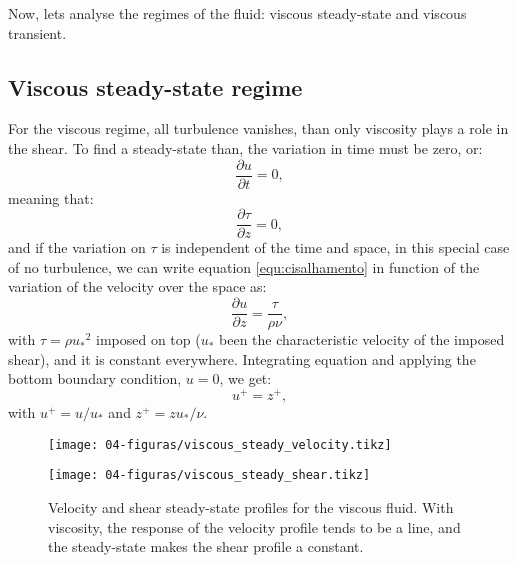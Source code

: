     Now, lets analyse the regimes of the fluid: viscous steady-state and viscous transient.

\subsection{Viscous steady-state regime}
\label{sec:viscous_steady}
    For the viscous regime, all turbulence vanishes, than only viscosity plays a role in the shear. To find a steady-state than, the variation in time must be zero, or:
    \begin{equation}
        \frac{\partial u}{\partial t} = 0,
        \label{equ:dudt0}
    \end{equation}
meaning that:
    \begin{equation}
        \frac{\partial \tau}{\partial z} = 0,
        \label{equ:dtaudz0}
    \end{equation}
and if the variation on $\tau$ is independent of the time and space, in this special case of no turbulence, we can write equation \ref{equ:cisalhamento} in function of the variation of the velocity over the space as:
    \begin{equation}
        \frac{\partial u}{\partial z} = \frac{\tau}{\rho \nu},
        \label{equ:viscous_steady0}
    \end{equation}
with $\tau = \rho {u_{*}}^{2}$ imposed on top ($u_{*}$ been the characteristic velocity of the imposed shear), and it is constant everywhere. Integrating equation and applying the bottom boundary condition, $u=0$, we get:
    \begin{equation}
        u^+ = z^+,
        \label{equ:viscous_steady1}
    \end{equation}
with $u^+ = u/u_{*}$ and $z^+ = z u_{*}/\nu$.

    \begin{figure}[H]
        \centering
        \parbox{0.495\textwidth}{
            \centering
            \texttt{[image: 04-figuras/viscous\_steady\_velocity.tikz]}
            \label{fig:viscous_steady_velocity}
        }
        \parbox{0.495\textwidth}{
            \centering
            \texttt{[image: 04-figuras/viscous\_steady\_shear.tikz]}
            \label{fig:viscous_steady_shear}
        }
        \caption[Steady-state analytical solution for viscous fluid profiles.]{Velocity and shear steady-state profiles for the viscous fluid. With viscosity, the response of the velocity profile tends to be a line, and the steady-state makes the shear profile a constant.}
        \label{fig:viscous_steady}
    \end{figure}

